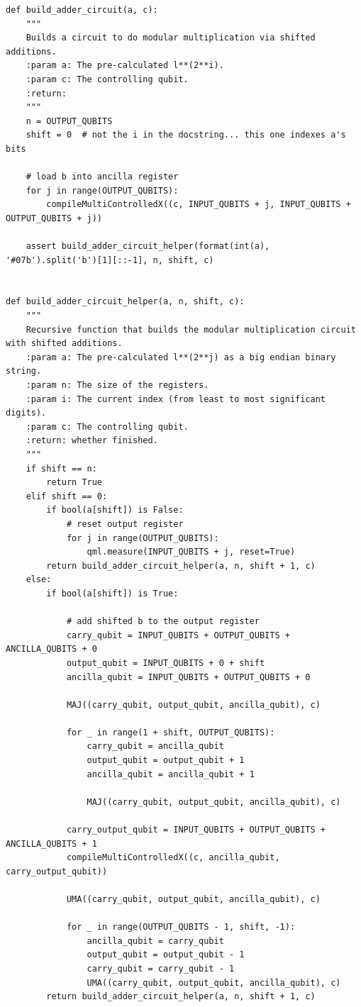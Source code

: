 \documentclass{article}
\begin{document}
\begin{lstlisting}
def build_adder_circuit(a, c):
    """
    Builds a circuit to do modular multiplication via shifted additions.
    :param a: The pre-calculated l**(2**i).
    :param c: The controlling qubit.
    :return:
    """
    n = OUTPUT_QUBITS
    shift = 0  # not the i in the docstring... this one indexes a's bits

    # load b into ancilla register
    for j in range(OUTPUT_QUBITS):
        compileMultiControlledX((c, INPUT_QUBITS + j, INPUT_QUBITS + OUTPUT_QUBITS + j))

    assert build_adder_circuit_helper(format(int(a), '#07b').split('b')[1][::-1], n, shift, c)


def build_adder_circuit_helper(a, n, shift, c):
    """
    Recursive function that builds the modular multiplication circuit with shifted additions.
    :param a: The pre-calculated l**(2**j) as a big endian binary string.
    :param n: The size of the registers.
    :param i: The current index (from least to most significant digits).
    :param c: The controlling qubit.
    :return: whether finished.
    """
    if shift == n:
        return True
    elif shift == 0:
        if bool(a[shift]) is False:
            # reset output register
            for j in range(OUTPUT_QUBITS):
                qml.measure(INPUT_QUBITS + j, reset=True)
        return build_adder_circuit_helper(a, n, shift + 1, c)
    else:
        if bool(a[shift]) is True:

            # add shifted b to the output register
            carry_qubit = INPUT_QUBITS + OUTPUT_QUBITS + ANCILLA_QUBITS + 0
            output_qubit = INPUT_QUBITS + 0 + shift
            ancilla_qubit = INPUT_QUBITS + OUTPUT_QUBITS + 0

            MAJ((carry_qubit, output_qubit, ancilla_qubit), c)

            for _ in range(1 + shift, OUTPUT_QUBITS):
                carry_qubit = ancilla_qubit
                output_qubit = output_qubit + 1
                ancilla_qubit = ancilla_qubit + 1

                MAJ((carry_qubit, output_qubit, ancilla_qubit), c)

            carry_output_qubit = INPUT_QUBITS + OUTPUT_QUBITS + ANCILLA_QUBITS + 1
            compileMultiControlledX((c, ancilla_qubit, carry_output_qubit))

            UMA((carry_qubit, output_qubit, ancilla_qubit), c)

            for _ in range(OUTPUT_QUBITS - 1, shift, -1):
                ancilla_qubit = carry_qubit
                output_qubit = output_qubit - 1
                carry_qubit = carry_qubit - 1
                UMA((carry_qubit, output_qubit, ancilla_qubit), c)
        return build_adder_circuit_helper(a, n, shift + 1, c)

\end{lstlisting}
\end{document}
